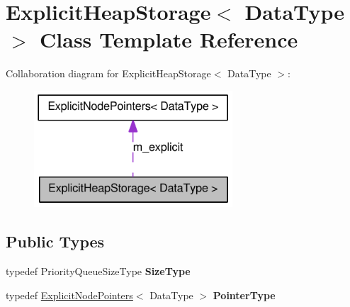 \hypertarget{class_explicit_heap_storage}{
\section{ExplicitHeapStorage$<$ DataType $>$ Class Template Reference}
\label{class_explicit_heap_storage}
}


Collaboration diagram for ExplicitHeapStorage$<$ DataType $>$:\nopagebreak
\begin{figure}[H]
\begin{center}
\leavevmode
\includegraphics[width=210pt]{class_explicit_heap_storage__coll__graph}
\end{center}
\end{figure}
\subsection*{Public Types}
\begin{DoxyCompactItemize}
\item 
\hypertarget{class_explicit_heap_storage_a5d5f82c2b9e383cf1d4553a26436a867}{
typedef PriorityQueueSizeType {\bfseries SizeType}}
\label{class_explicit_heap_storage_a5d5f82c2b9e383cf1d4553a26436a867}

\item 
\hypertarget{class_explicit_heap_storage_a45c9e2c26f811f05171a9e53cc173a32}{
typedef \hyperlink{class_explicit_node_pointers}{ExplicitNodePointers}$<$ DataType $>$ {\bfseries PointerType}}
\label{class_explicit_heap_storage_a45c9e2c26f811f05171a9e53cc173a32}

\end{DoxyCompactItemize}
